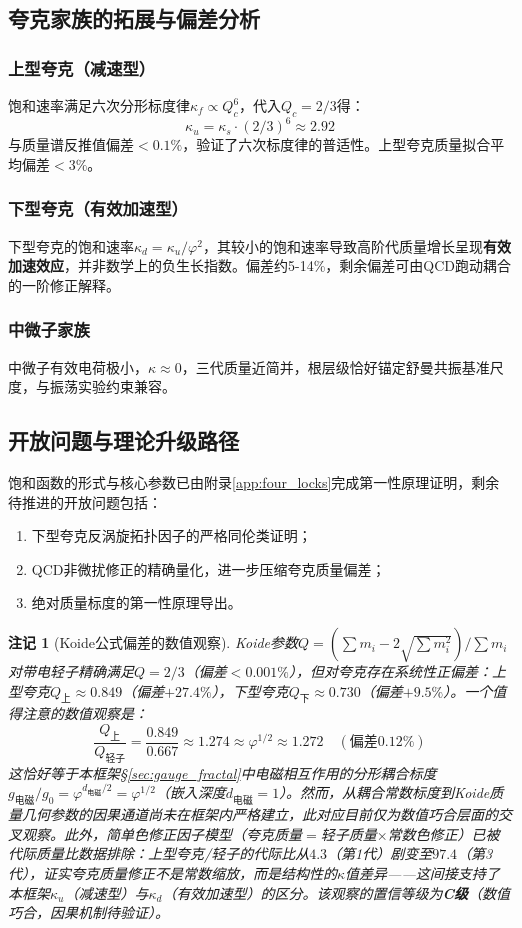 \documentclass[12pt,a4paper,twocolumn]{article}
\renewcommand{\phi}{\varphi}
\newtheorem{remark}[theorem]{注记}
\begin{document}
\subsection{夸克家族的拓展与偏差分析}
\subsubsection{上型夸克（减速型）}
饱和速率满足六次分形标度律$\kappa_f \propto Q_c^6$，代入$Q_c = 2/3$得：
\[
\kappa_u = \kappa_s \cdot (2/3)^6 \approx 2.92
\]
与质量谱反推值偏差$<0.1\%$，验证了六次标度律的普适性。上型夸克质量拟合平均偏差$<3\%$。

\subsubsection{下型夸克（有效加速型）}
下型夸克的饱和速率$\kappa_d = \kappa_u/\phi^2$，其较小的饱和速率导致高阶代质量增长呈现\textbf{有效加速效应}，并非数学上的负生长指数。偏差约5-14\%，剩余偏差可由QCD跑动耦合的一阶修正解释。

\subsubsection{中微子家族}
中微子有效电荷极小，$\kappa \approx 0$，三代质量近简并，根层级恰好锚定舒曼共振基准尺度，与振荡实验约束兼容。

\subsection{开放问题与理论升级路径}
饱和函数的形式与核心参数已由附录\ref{app:four_locks}完成第一性原理证明，剩余待推进的开放问题包括：
\begin{enumerate}
\item 下型夸克反涡旋拓扑因子的严格同伦类证明；
\item QCD非微扰修正的精确量化，进一步压缩夸克质量偏差；
\item 绝对质量标度的第一性原理导出。
\end{enumerate}

\begin{remark}[Koide公式偏差的数值观察]
Koide参数$Q = (\sum m_i - 2\sqrt{\sum m_i^2}) / \sum m_i$对带电轻子精确满足$Q = 2/3$（偏差$<0.001\%$），但对夸克存在系统性正偏差：上型夸克$Q_{\text{上}} \approx 0.849$（偏差$+27.4\%$），下型夸克$Q_{\text{下}} \approx 0.730$（偏差$+9.5\%$）。一个值得注意的数值观察是：
\[
\frac{Q_{\text{上}}}{Q_{\text{轻子}}} = \frac{0.849}{0.667} \approx 1.274 \approx \phi^{1/2} \approx 1.272 \quad (\text{偏差}0.12\%)
\]
这恰好等于本框架§\ref{sec:gauge_fractal}中电磁相互作用的分形耦合标度$g_{\text{电磁}}/g_0 = \phi^{d_{\text{电磁}}/2} = \phi^{1/2}$（嵌入深度$d_{\text{电磁}}=1$）。然而，从耦合常数标度到Koide质量几何参数的因果通道尚未在框架内严格建立，此对应目前仅为数值巧合层面的交叉观察。此外，简单色修正因子模型（夸克质量$=$轻子质量$\times$常数色修正）已被代际质量比数据排除：上型夸克/轻子的代际比从$4.3$（第1代）剧变至$97.4$（第3代），证实夸克质量修正不是常数缩放，而是结构性的$\kappa$值差异——这间接支持了本框架$\kappa_u$（减速型）与$\kappa_d$（有效加速型）的区分。该观察的置信等级为\textbf{C级}（数值巧合，因果机制待验证）。
\end{remark}
\end{document}
